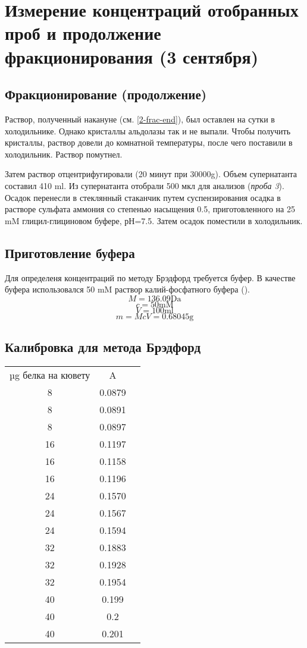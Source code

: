 \section{Измерение концентраций отобранных проб и продолжение фракционирования (3 сентября)}

\subsection{Фракционирование (продолжение)}
Раствор, полученный накануне (см. \ref{2-frac-end}), был оставлен на сутки в холодильнике.
Однако кристаллы альдолазы так и не выпали.
Чтобы получить кристаллы, раствор довели до комнатной температуры,
после чего поставили в холодильник. Раствор помутнел.

Затем раствор отцентрифугировали (20 минут при 30000g).
Объем супернатанта составил 410 ml.
Из супернатанта отобрали 500 мкл для анализов (\emph{проба 3}).
Осадок перенесли в стеклянный стаканчик путем суспензирования осадка
в растворе сульфата аммония со степенью насыщения 0.5,
приготовленного на 25 mM глицил-глициновом буфере, рН=7.5.
Затем осадок поместили в холодильник.

\subsection{Приготовление буфера}
Для определеня концентраций по методу Брэдфорд требуется буфер.
В качестве буфера использовался 50 mM раствор калий-фосфатного буфера ().
$$ M = 136.09 \text{Da} $$
$$ c = 50 \text{mM} $$
$$ V = 100 \text{ml} $$
$$ m = McV = 0.68045 \text{g} $$

\subsection{Калибровка для метода Брэдфорд}
\label{A0k}

\begin{tabular}{|c|c|c|}
\hline
µg белка на кювету & A \\
8  &  0.0879 \\
8  &  0.0891 \\
8  &  0.0897 \\
\hline
16 &  0.1197 \\
16 &  0.1158 \\
16 &  0.1196 \\
\hline
24 &  0.1570 \\
24 &  0.1567 \\
24 &  0.1594 \\
\hline
32 &  0.1883 \\
32 &  0.1928 \\
32 &  0.1954 \\
\hline
40 &  0.199 \\
40 &  0.2 \\
40 &  0.201 \\
\hline
\end{tabular}

